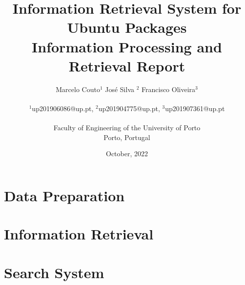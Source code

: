 \documentclass[a4paper, 6pt, twocolumn]{article}
\date{October, 2022}
\begin{document}
\linespread{0.5}

\title{\textbf{Information Retrieval System for Ubuntu Packages}\\Information Processing and Retrieval Report}

\author{Marcelo Couto$^{1}$   José Silva $^2$   Francisco Oliveira$^3$ \\ \\ 
$^1$up201906086@up.pt, $^2$up201904775@up.pt, $^3$up201907361@up.pt \\ \\ 
Faculty of Engineering of the University of Porto \\ 
Porto, Portugal}



\maketitle 
\pagestyle{fancy}
\fancyhf{}
\fancyfoot[C]{\thepage}





\part{Data Preparation}







\part{Information Retrieval}




\part{Search System}








\end{document}

